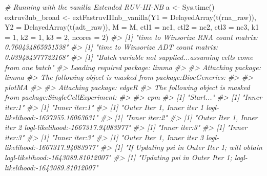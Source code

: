 \documentclass[]{article}
\newcommand{\hlnum}[1]{\textcolor[rgb]{0.816,0.125,0.439}{#1}}%
\newcommand{\hlcom}[1]{\textcolor[rgb]{0.502,0.502,0.502}{\textit{#1}}}%
\newcommand{\hlstd}[1]{\textcolor[rgb]{0.251,0.251,0.251}{#1}}%
\newenvironment{Shaded}{\begin{myshaded}}{\end{myshaded}}
\newcommand{\DecValTok}[1]{\hlnum{#1}}
\newcommand{\CommentTok}[1]{\hlcom{#1}}
\newcommand{\OtherTok}[1]{{#1}}
\newcommand{\FunctionTok}[1]{\hlstd{#1}}
\newcommand{\AttributeTok}[1]{{#1}}
\newcommand{\NormalTok}[1]{\hlstd{#1}}
\begin{document}
\begin{Shaded}
\begin{Highlighting}[]
\CommentTok{\# Running with the vanilla Extended RUV{-}III{-}NB}
\NormalTok{a }\OtherTok{\textless{}{-}} \FunctionTok{Sys.time}\NormalTok{()}
\NormalTok{extruv3nb\_broad }\OtherTok{\textless{}{-}} \FunctionTok{extFastruvIIInb\_vanilla}\NormalTok{(}\AttributeTok{Y1 =} \FunctionTok{DelayedArray}\NormalTok{(}\FunctionTok{t}\NormalTok{(rna\_raw)),}
    \AttributeTok{Y2 =} \FunctionTok{DelayedArray}\NormalTok{(}\FunctionTok{t}\NormalTok{(adt\_raw)), }\AttributeTok{M =}\NormalTok{ M, }\AttributeTok{ctl1 =}\NormalTok{ nc1, }\AttributeTok{ctl2 =}\NormalTok{ nc2,}
    \AttributeTok{ctl3 =}\NormalTok{ nc3, }\AttributeTok{k1 =} \DecValTok{1}\NormalTok{, }\AttributeTok{k2 =} \DecValTok{1}\NormalTok{, }\AttributeTok{k3 =} \DecValTok{2}\NormalTok{, }\AttributeTok{ncores =} \DecValTok{2}\NormalTok{)}
\CommentTok{\#\textgreater{} [1] "time to Winsorize RNA count matrix: 0.760434865951538"}
\CommentTok{\#\textgreater{} [1] "time to Winsorize ADT count matrix: 0.039484977722168"}
\CommentTok{\#\textgreater{} [1] "Batch variable not supplied...assuming cells come from one batch"}
\CommentTok{\#\textgreater{} Loading required package: limma}
\CommentTok{\#\textgreater{} }
\CommentTok{\#\textgreater{} Attaching package: \textquotesingle{}limma\textquotesingle{}}
\CommentTok{\#\textgreater{} The following object is masked from \textquotesingle{}package:BiocGenerics\textquotesingle{}:}
\CommentTok{\#\textgreater{} }
\CommentTok{\#\textgreater{}     plotMA}
\CommentTok{\#\textgreater{} }
\CommentTok{\#\textgreater{} Attaching package: \textquotesingle{}edgeR\textquotesingle{}}
\CommentTok{\#\textgreater{} The following object is masked from \textquotesingle{}package:SingleCellExperiment\textquotesingle{}:}
\CommentTok{\#\textgreater{} }
\CommentTok{\#\textgreater{}     cpm}
\CommentTok{\#\textgreater{} [1] "Start..."}
\CommentTok{\#\textgreater{} [1] "Inner iter:1"}
\CommentTok{\#\textgreater{} [1] "Inner iter:1"}
\CommentTok{\#\textgreater{} [1] "Outer Iter 1, Inner iter 1 logl{-}likelihood:{-}1697955.16063631"}
\CommentTok{\#\textgreater{} [1] "Inner iter:2"}
\CommentTok{\#\textgreater{} [1] "Outer Iter 1, Inner iter 2 logl{-}likelihood:{-}1667317.94083977"}
\CommentTok{\#\textgreater{} [1] "Inner iter:3"}
\CommentTok{\#\textgreater{} [1] "Inner iter:3"}
\CommentTok{\#\textgreater{} [1] "Inner iter:3"}
\CommentTok{\#\textgreater{} [1] "Outer Iter 1, Inner iter 3 logl{-}likelihood:{-}1667317.94083977"}
\CommentTok{\#\textgreater{} [1] "If Updating psi in Outer Iter 1; will obtain logl{-}likelihood:{-}1643089.81012007"}
\CommentTok{\#\textgreater{} [1] "Updating psi in Outer Iter 1; logl{-}likelihood:{-}1643089.81012007"}

\end{Highlighting}
\end{Shaded}
\end{document}

